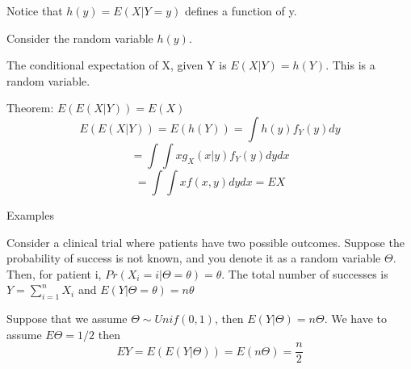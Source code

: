 \documentclass{report}
\begin{document}
\begin{description}
\begin{mdframed}
           Notice that $h(y) = E(X|Y=y)$ defines a function of
           y.
        \end{mdframed}
        \begin{mdframed}
            Consider the random variable $h(y)$.

            \vspace{10}
           
            The conditional expectation of X, given Y is
            $E(X|Y) = h(Y)$. This is a random variable.

            \vspace{10}

            Theorem: $E(E(X|Y)) = E(X)$
            \begin{displaymath}
                E(E(X|Y)) = E(h(Y)) = \int h(y)f_Y(y)dy
            \end{displaymath}
            \begin{displaymath}
                = \int \int xg_X(x|y) f_Y(y)dydx
            \end{displaymath}
            \begin{displaymath}
                = \int \int xf(x,y)dydx = EX
            \end{displaymath}
        \end{mdframed}
    \item {\large Examples} 
        \begin{mdframed}
            Consider a clinical trial where patients have
            two possible outcomes. Suppose the probability
            of success is not known, and you denote it as
            a random variable $\Theta$. Then, for patient
            i,  $Pr(X_i = i | \Theta = \theta) = \theta$. The
            total number of successes is
            $Y= \sum_{i=1}^n X_i$ and  $E(Y|\Theta = \theta) = n \theta$

            \vspace{10}
            
            Suppose that we assume $\Theta \sim Unif(0,1)$,
            then $E(Y|\Theta) = n\Theta$. We have to assume
            $E\Theta = 1/2$ then
            \begin{displaymath}
                EY = E(E(Y|\Theta)) = E(n\Theta) = \frac{n}{2}
            \end{displaymath}
            

            
        \end{mdframed}
    \item {\large} 
\end{description}
\end{document}
